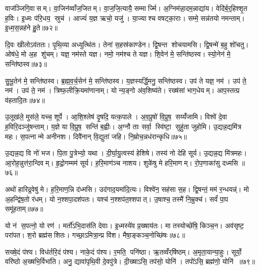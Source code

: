 वाज॑ञ्जिगि॒वासम्। वा॒जिन॑व्वाँज॒जितम्। वा॒ज॒जि॒त्यायै॒ सम्मार्ज्मि। अ॒ग्निम॑न्ना॒दम॒न्नाद्या॑य। वेदि॑र्ब॒र्॒हिश्शृ॒त ह॒विः। इ॒ध्मः प॑रि॒धय॒ स्रुच॑। आज्यं॑ य॒ज्ञ ऋचो॒ यजु॑। या॒ज्याश्च वषट्का॒राः। सम्मे॒ सन्न॑तयो नमन्ताम्। इ॒ध्म॒स॒न्नह॑ने हु॒ते॥७२॥

दि॒वः खीलोऽव॑ततः। पृ॒थि॒व्या अध्युत्थि॑तः। तेना॑ स॒हस्र॑काण्डेन। द्वि॒षन्त शोचयामसि। द्वि॒षन्मे॑ ब॒हु शो॑चतु। ओष॑धे॒ मो अ॒ह शु॑चम्। यज्ञ॒ नम॑स्ते यज्ञ। नमो॒ नम॑श्च ते यज्ञ। शि॒वेन॑ मे॒ सन्ति॑ष्ठस्व। स्यो॒नेन॑ मे॒ सन्ति॑ष्ठस्व॥७३॥

सु॒भू॒तेन॑ मे॒ सन्ति॑ष्ठस्व। ब्र॒ह्म॒व॒र्च॒सेन॑ मे॒ सन्ति॑ष्ठस्व। य॒ज्ञस्यर्द्धि॒मनु॒ सन्ति॑ष्ठस्व। उप॑ ते यज्ञ॒ नम॑। उप॑ ते॒ नम॑। उप॑ ते॒ नम॑। त्रिष्फ॒लीक्रि॒यमा॑णानाम्। यो न्य॒ङ्गो अ॑व॒शिष्य॑ते। रख्ष॑सां भाग॒धेयम्। आप॒स्तत्प्र व॑हतादि॒तः॥७४॥

उ॒लूख॑ले॒ मुस॑ले॒ यच्च॒ शूर्पे। आ॒शि॒श्लेष॑ दृ॒षदि॒ यत्क॒पाले। अ॒व॒प्रुषो॑ वि॒प्रुष॒ सय्यँ॑जामि। विश्वे॑ दे॒वा ह॒विरि॒दञ्जु॑षन्ताम्। य॒ज्ञे या वि॒प्रुष॒ सन्ति॑ ब॒ह्वीः। अ॒ग्नौ ताः सर्वा॒ स्वि॑ष्टा॒ सुहु॑ता जुहोमि। उ॒द्यन्न॒द्यमि॑त्र महः। स॒पत्नान्मे अनीनशः। दिवै॑नान् वि॒द्युता॑ जहि। नि॒म्रोच॒न्नध॑रान्कृधि॥७५॥

उ॒द्यन्न॒द्य वि नो॑ भज। पि॒ता पु॒त्रेभ्यो॒ यथा। दी॒र्घा॒यु॒त्वस्य॑ हेशिषे। तस्य॑ नो देहि सूर्य। उ॒द्यन्न॒द्य मि॑त्रमहः। आ॒रोह॒न्नुत्त॑रा॒न्दिवम्। हृ॒द्रो॒गम्मम॑ सूर्य। ह॒रि॒माण॑ञ्च नाशय। शुके॑षु मे हरि॒माणम्। रो॒प॒णाका॑सु दध्मसि ॥७६॥

अथो॑ हारिद्र॒वेषु॑ मे। ह॒रि॒माण॒न्नि द॑ध्मसि। उद॑गाद॒यमा॑दि॒त्यः। विश्वे॑न॒ सह॑सा स॒ह। द्वि॒षन्तं॒ मम॑ र॒न्धयन्न्॑। मो अ॒हन्द्वि॑ष॒तो र॑धम्। यो न॒श्शपा॒दश॑पतः। यश्च॑ न॒श्शप॑त॒श्शपात्। उ॒षाश्च॒ तस्मै॑ नि॒म्रुक्च॑। सर्वं॑ पा॒प समू॑हताम्॥७७॥

यो न॑ स॒पत्नो॒ यो रण॑। मर्तो॑ऽभि॒दास॑ति देवाः। इ॒ध्मस्ये॑व प्र॒ख्षाय॑तः। मा तस्योच्छे॑षि॒ किञ्च॒न। अव॑सृष्ट॒ परा॑पत। श॒रो ब्रह्म॑सशितः। गच्छा॒ऽमित्रा॒न्प्र वि॑श। मैषा॒ङ्कञ्च॒नोच्छि॑षः॥७८॥\anuvakamend[पति॑ प्र॒जाप॑तये तप॒स्वी वा॒चा सौभ॑गाय प॒शून्मे॑ पिन्वस्व दुर्मरा॒युन्दे॑व॒याना॑नग्ने॒ऽन्तरि॑ख्षे॒ऽहमुत्त॑रो भूयासं प्र॒जाप॑तिरसि स॒र्वत॑श्श्रि॒तः प्रवि॑ष्टन्दे॒वता॑भिर्वाज॒जितं॑ पृथि॒वी ह्व॑यताम॒ग्निराग्नीध्राद्वृश्चत ससृ॒वास हु॒ते स्यो॒नेन॑ मे॒ सन्ति॑ष्ठस्वे॒तः कृ॑धि दध्मस्यूहताम॒ष्टौ च॑]

सख्षे॒दं प॑श्य। विध॑र्तरि॒दं प॑श्य। नाके॒दं प॑श्य। र॒मति॒ पनि॑ष्ठा। ऋ॒तव्वँर्‌षि॑ष्ठम्। अ॒मृता॒यान्या॒हुः। सूर्यो॒ वरि॑ष्ठो अ॒ख्षभि॒र्विभा॑ति। अनु॒ द्यावा॑पृथि॒वी दे॒वपु॑त्रे। दी॒ख्षाऽसि॒ तप॑सो॒ योनि॑। तपो॑ऽसि॒ ब्रह्म॑णो॒ योनि॑ ॥७९॥

